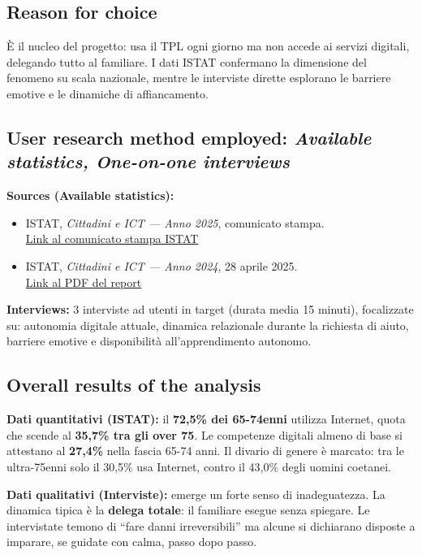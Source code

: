 \documentclass[11pt,a4paper]{article}
\begin{document}
\subsection*{Reason for choice}
\begin{tcolorbox}[colback=backgroundColor,colframe=borderColor,arc=2mm]
È il nucleo del progetto: usa il TPL ogni giorno ma non accede ai
servizi digitali, delegando tutto al familiare. I dati ISTAT confermano
la dimensione del fenomeno su scala nazionale, mentre le interviste
dirette esplorano le barriere emotive e le dinamiche di affiancamento.
\end{tcolorbox}

\subsection*{User research method employed: \textit{Available statistics, One-on-one interviews}}
\begin{tcolorbox}[colback=backgroundColor,colframe=borderColor,arc=2mm]
\textbf{Sources (Available statistics):}
\begin{itemize}[leftmargin=*]
  \item ISTAT, \textit{Cittadini e ICT --- Anno 2025}, comunicato stampa.\\
  \href{https://www.istat.it/comunicato-stampa/cittadini-e-ict-anno-2025/}{Link al comunicato stampa ISTAT}
  \item ISTAT, \textit{Cittadini e ICT --- Anno 2024}, 28 aprile 2025.\\
  \href{https://www.istat.it/wp-content/uploads/2025/04/REPORT_CITTADINI-E-ICT_2024.pdf}{Link al PDF del report}
\end{itemize}

\vspace{0.3cm}
\textbf{Interviews:} 3 interviste ad utenti in target (durata media
15 minuti), focalizzate su: autonomia digitale attuale, dinamica
relazionale durante la richiesta di aiuto, barriere emotive e
disponibilità all'apprendimento autonomo.
\end{tcolorbox}

\subsection*{Overall results of the analysis}
\begin{tcolorbox}[colback=backgroundColor,colframe=borderColor,arc=2mm]
\textbf{Dati quantitativi (ISTAT):} il \textbf{72,5\% dei 65-74enni}
utilizza Internet, quota che scende al \textbf{35,7\% tra gli over 75}.
Le competenze digitali almeno di base si attestano al \textbf{27,4\%}
nella fascia 65-74 anni. Il divario di genere è marcato: tra le
ultra-75enni solo il 30,5\% usa Internet, contro il 43,0\% degli
uomini coetanei.

\vspace{0.2cm}
\textbf{Dati qualitativi (Interviste):} emerge un forte senso di
inadeguatezza. La dinamica tipica è la \textbf{delega totale}: il
familiare esegue senza spiegare. Le intervistate temono di ``fare
danni irreversibili'' ma alcune si dichiarano disposte a imparare,
se guidate con calma, passo dopo passo.
\end{tcolorbox}
\end{document}
